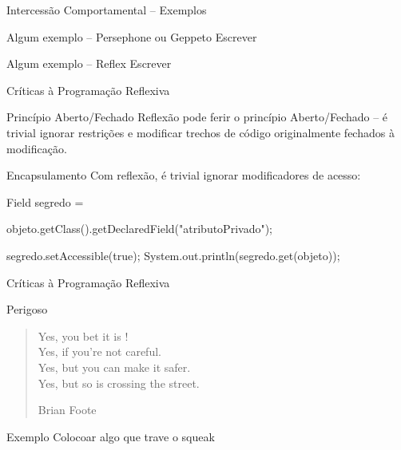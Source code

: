 \documentclass[12pt,t]{beamer}
\begin{document}
 	 \begin{frame}{Intercessão Comportamental -- Exemplos}
 	 	\begin{exampleblock}{Algum exemplo -- Persephone ou Geppeto}
 	 		\alert{Escrever}
 	 	\end{exampleblock}
 	 	\pause
 	 	\begin{exampleblock}{Algum exemplo -- Reflex}
 	 		\alert{Escrever}
 	 	\end{exampleblock}
 	 \end{frame} 	 
 	 \begin{frame}{Críticas à Programação Reflexiva}
 	 	\begin{block}{Princípio Aberto/Fechado}
 	 		Reflexão pode ferir o princípio Aberto/Fechado \cite{meyer1988object} -- é trivial ignorar restrições e modificar trechos de código originalmente fechados à modificação.
 	 	\end{block}
 	 	\pause
 	 	\begin{block}{Encapsulamento}
 	 		Com reflexão, é trivial ignorar modificadores de acesso:
 	 		\begin{adjustwidth}{2.5em}{0pt}
 	 			Field segredo = \\
 	 			\begin{adjustwidth}{2.5em}{0pt}
 	 				objeto.getClass().getDeclaredField("atributoPrivado");
 	 			\end{adjustwidth}
				segredo.setAccessible(true);
				System.out.println(segredo.get(objeto));
			\end{adjustwidth}
 	 	\end{block}
 	 \end{frame}
 	 \begin{frame}{Críticas à Programação Reflexiva}
 	 	\begin{block}{Perigoso}
 	 		\begin{quote}
				Yes, you bet it is ! \\
				Yes, if you're not careful. \\
				Yes, but you can make it safer. \\
				Yes, but so is crossing the street.
 	 			\begin{flushright}
 	 				Brian Foote
 	 			\end{flushright}
 	 		\end{quote}
 	 	\end{block}
 	 	\pause
 	 	\begin{exampleblock}{Exemplo}
 	 		\alert{Colocoar algo que trave o squeak}
 	 	\end{exampleblock}
 	 \end{frame}
\end{document}
